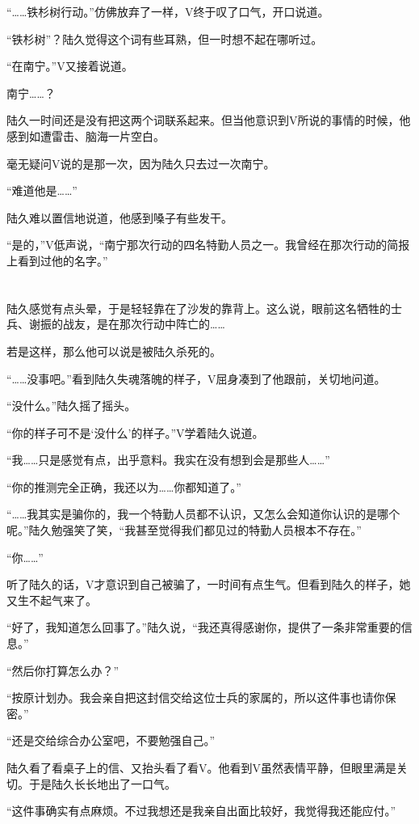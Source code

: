 “……铁杉树行动。”仿佛放弃了一样，V终于叹了口气，开口说道。

“铁杉树”？陆久觉得这个词有些耳熟，但一时想不起在哪听过。

“在南宁。”V又接着说道。

南宁……？

陆久一时间还是没有把这两个词联系起来。但当他意识到V所说的事情的时候，他感到如遭雷击、脑海一片空白。

毫无疑问V说的是那一次，因为陆久只去过一次南宁。

“难道他是……”

陆久难以置信地说道，他感到嗓子有些发干。

“是的，”V低声说，“南宁那次行动的四名特勤人员之一。我曾经在那次行动的简报上看到过他的名字。”

\section*{}

陆久感觉有点头晕，于是轻轻靠在了沙发的靠背上。这么说，眼前这名牺牲的士兵、谢振的战友，是在那次行动中阵亡的……

若是这样，那么他可以说是被陆久杀死的。

“……没事吧。”看到陆久失魂落魄的样子，V屈身凑到了他跟前，关切地问道。

“没什么。”陆久摇了摇头。

“你的样子可不是‘没什么’的样子。”V学着陆久说道。

“我……只是感觉有点，出乎意料。我实在没有想到会是那些人……”

“你的推测完全正确，我还以为……你都知道了。”

“……我其实是骗你的，我一个特勤人员都不认识，又怎么会知道你认识的是哪个呢。”陆久勉强笑了笑，“我甚至觉得我们都见过的特勤人员根本不存在。”

“你……”

听了陆久的话，V才意识到自己被骗了，一时间有点生气。但看到陆久的样子，她又生不起气来了。

“好了，我知道怎么回事了。”陆久说，“我还真得感谢你，提供了一条非常重要的信息。”

“然后你打算怎么办？”

“按原计划办。我会亲自把这封信交给这位士兵的家属的，所以这件事也请你保密。”

“还是交给综合办公室吧，不要勉强自己。”

陆久看了看桌子上的信、又抬头看了看V。他看到V虽然表情平静，但眼里满是关切。于是陆久长长地出了一口气。

“这件事确实有点麻烦。不过我想还是我亲自出面比较好，我觉得我还能应付。”

